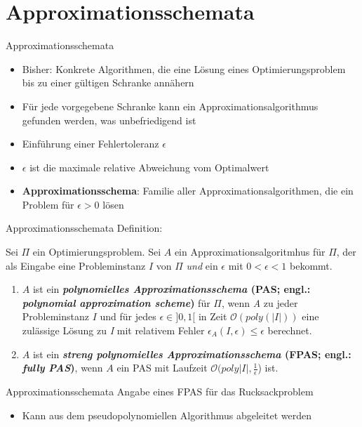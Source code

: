 \section{Approximationsschemata}
\begin{frame}{Approximationsschemata}


\begin{itemize}
\item Bisher: Konkrete Algorithmen, die eine Lösung eines Optimierungsproblem bis zu einer gültigen Schranke annähern
\item Für jede vorgegebene Schranke kann ein Approximationsalgorithmus gefunden werden, was unbefriedigend ist
\item Einführung einer Fehlertoleranz $\epsilon$
\item $\epsilon$ ist die maximale relative Abweichung vom Optimalwert
\item \textbf{Approximationsschema}: Familie aller Approximationsalgorithmen, die ein Problem für $\epsilon > 0$ lösen
\end{itemize}
\end{frame}

\begin{frame}{Approximationsschemata}	
    Definition:
			
Sei $\Pi$ ein Optimierungsproblem. Sei $A$ ein Approximationsalgoritmhus für $\Pi$, der als Eingabe eine Probleminstanz $I$ von $\Pi$ \textit{und} ein $\epsilon$ mit $0 < \epsilon < 1$ bekommt.

\begin{enumerate}
\item
$A$ ist ein \textbf{\textit{polynomielles Approximationsschema} (PAS; engl.: \textit{polynomial approximation scheme})} für $\Pi$, wenn \textit{A} zu jeder Probleminstanz $I$ und für jedes $\epsilon \in ] 0,1 [$ in Zeit $\mathcal O(poly(|I|))$ eine zulässige Lösung zu \textit{I} mit relativem Fehler $\epsilon_A(\textit{I},\epsilon) \leqslant \epsilon$ berechnet.

\item
$A$ ist ein \textbf{\textit{streng polynomielles Approximationsschema} (FPAS; engl.: \textit{fully PAS})}, wenn $A$ ein PAS mit Laufzeit $\mathcal O(poly|I|, \frac{1}{\epsilon}$) ist.

\end{enumerate}		      
\end{frame}

\begin{frame}{Approximationsschemata}
Angabe eines FPAS für das Rucksackproblem
\begin{itemize}
\item Kann aus dem pseudopolynomiellen Algorithmus abgeleitet werden
\end{itemize}
\end{frame}
